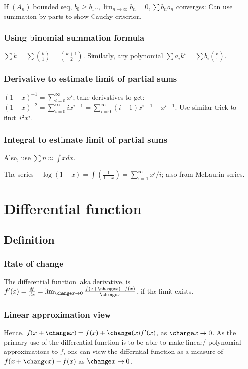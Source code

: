\documentclass[oneside, article]{memoir}
\begin{document}
If $(A_{n})$ bounded seq, $b_{0} \geq b_{1} .., \lim_{n \to \infty} b_{n} = 0, \sum b_{n}a_{n}$ converges: Can use summation by parts to show Cauchy criterion.

\subsection{Using binomial summation formula}
$\sum k = \sum \binom{k}{1} = \binom{k+1}{2}$. Similarly, any polynomial $\sum a_{i}k^{i} = \sum b_{i}\binom{k}{i}$.

\subsection{Derivative to estimate limit of partial sums}
$(1-x)^{-1} = \sum_{i=0}^{\infty} x^{i}$; take derivatives to get: $(1-x)^{-2} = \sum_{i=0}^{\infty} ix^{i-1} = \sum_{i=0}^{\infty} (i-1)x^{i-1} - x^{i-1}$. Use similar trick to find: $i^{2}x^{i}$.

\subsection{Integral to estimate limit of partial sums}
Also, use $\sum n \approx \int x dx$.

The series $-\log (1 - x) = \int(\frac{1}{1-x}) = \sum_{i=1}^{\infty} x^{i}/i$; also from McLaurin series.


\chapter{Differential function}
\section{Definition}
\subsection{Rate of change}
The differential function, aka derivative, is \\
$f'(x) = \frac{df}{dx}= \lim_{\change x \to 0} \frac{f(x+\change x) - f(x)}{\change x}$, if the limit exists.

\subsection{Linear approximation view}
Hence, $f(x + \change x) = f(x) + \change(x) f'(x)$, as $\change x \to 0$.
As the primary use of the differential function is to be able to make linear/ polynomial approximations to $f$, one can view the differntial function as a measure of $f(x + \change x) - f(x)$ as $\change x \to 0$.
\end{document}

